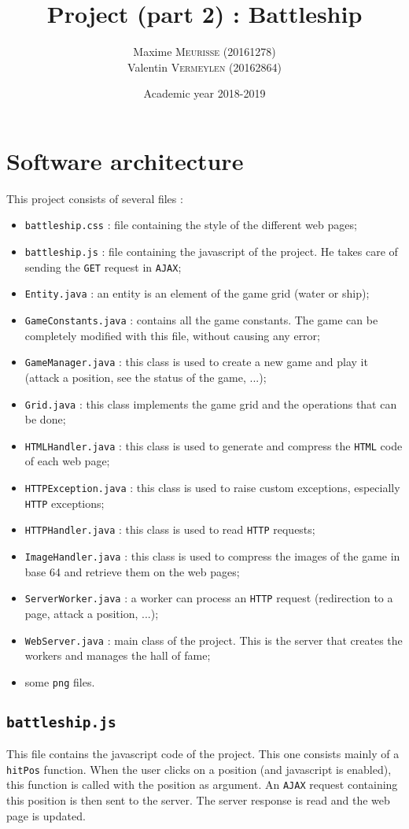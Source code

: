 \documentclass[a4paper, 12pt]{article}
\title{Project (part 2) : Battleship}
\author{
    Maxime \textsc{Meurisse} (20161278)\\
    Valentin \textsc{Vermeylen} (20162864)\\
}
\date{Academic year 2018-2019}
\begin{document}
	
	\section{Software architecture}
	This project consists of several files :
	\begin{itemize}
	    \item \texttt{battleship.css} : file containing the style of the different web pages;
	    \item \texttt{battleship.js} : file containing the javascript of the project. He takes care of sending the \texttt{GET} request in \texttt{AJAX};
	    \item \texttt{Entity.java} : an entity is an element of the game grid (water or ship);
	    \item \texttt{GameConstants.java} : contains all the game constants. The game can be completely modified with this file, without causing any error;
	    \item \texttt{GameManager.java} : this class is used to create a new game and play it (attack a position, see the status of the game, ...);
	    \item \texttt{Grid.java} : this class implements the game grid and the operations that can be done;
	    \item \texttt{HTMLHandler.java} : this class is used to generate and compress the \texttt{HTML} code of each web page;
	    \item \texttt{HTTPException.java} : this class is used to raise custom exceptions, especially \texttt{HTTP} exceptions;
	    \item \texttt{HTTPHandler.java} : this class is used to read \texttt{HTTP} requests;
	    \item \texttt{ImageHandler.java} : this class is used to compress the images of the game in base 64 and retrieve them on the web pages;
	    \item \texttt{ServerWorker.java} : a worker can process an \texttt{HTTP} request (redirection to a page, attack a position, ...);
	    \item \texttt{WebServer.java} : main class of the project. This is the server that creates the workers and manages the hall of fame;
	    \item some \texttt{png} files.
	\end{itemize}
	\subsection{\texttt{battleship.js}}
	This file contains the javascript code of the project. This one consists mainly of a \texttt{hitPos} function. When the user clicks on a position (and javascript is enabled), this function is called with the position as argument. An \texttt{AJAX} request containing this position is then sent to the server. The server response is read and the web page is updated.
\end{document}
